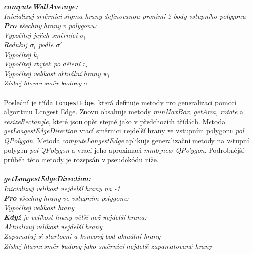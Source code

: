 \documentclass{article}
\begin{document}
\vspace{0.2cm}\\
\indent\textit{\textbf{computeWallAverage:}}\\
\indent\textit{Inicializuj směrnici $sigma$ hrany definovanou prvními 2 body vstupního polygonu}\\
\indent\textit{\textbf{Pro} všechny hrany v polygonu:}\\
\indent\indent\textit{Vypočítej jejich směrnici $\sigma_{i}$}\\
\indent\indent\textit{Redukuj $\sigma_{i}$ podle $\sigma'$}\\
\indent\indent\textit{Vypočítej  $k_{i}$}\\
\indent\indent\textit{Vypočítej zbytek po dělení $r_{i}$}\\
\indent\indent\textit{Vypočítej velikost aktuální hrany $w_{i}$}\\
\indent\textit{Získej hlavní směr budovy $\sigma$}\\
\vspace{0.2cm}\\
Poslední je třída \texttt{LongestEdge}, která definuje metody pro generalizaci pomocí algoritmu Longest Edge. Znovu obsahuje metody \emph{minMaxBox, getArea, rotate} a \emph{resizeRectangle}, které jsou opět stejné jako v předchozích třídách. Metoda \emph{getLongestEdgeDirection} vrací směrnici nejdelší hrany ve vstupním polygonu \emph{pol} \emph{QPolygon}. Metoda \emph{computeLongestEdge} aplikuje generalizační metody na vstupní polygon \emph{pol} \emph{QPolygon} a vrací jeho aproximaci $mmb\_new$ \emph{QPolygon}. Podrobnější průběh této metody je rozepsán v pseudokódu níže.\\
\vspace{0.2cm}\\
\indent\textit{\textbf{getLongestEdgeDirection:}}\\
\indent\textit{Inicializuj velikost nejdelší hrany na -1}\\
\indent\textit{\textbf{Pro} všechny hrany ve vstupním polygonu:}\\
\indent\indent\textit{Vypočítej velikost hrany}\\
\indent\indent\textit{\textbf{Když} je velikost hrany větší než nejdelší hrana:}\\
\indent\indent\indent\textit{Aktualizuj velikost nejdelší hrany}\\
\indent\indent\indent\textit{Zapamatuj si startovní a koncový bod aktuální hrany}\\
\indent\textit{Získej hlavní směr budovy jako směrnici nejdelší zapamatované hrany}\\
\vspace{10cm}\\
\end{document}
